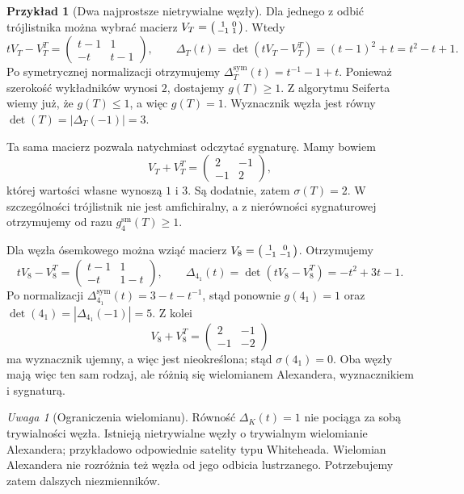 \documentclass[11pt,a4paper]{report}
\numberwithin{equation}{section}
\theoremstyle{plain}
\theoremstyle{definition}
\newtheorem{przyklad}[twierdzenie]{Przykład}
\theoremstyle{remark}
\newtheorem{uwaga}[twierdzenie]{Uwaga}
\begin{document}
\begin{przyklad}[Dwa najprostsze nietrywialne węzły]
Dla jednego z odbić trójlistnika można wybrać macierz
$V_T=\begin{psmallmatrix}1&0\\-1&1\end{psmallmatrix}$. Wtedy
\[
tV_T-V_T^T=
\begin{pmatrix}t-1&1\\-t&t-1\end{pmatrix},
\qquad
\Delta_T(t)=\det(tV_T-V_T^T)=(t-1)^2+t=t^2-t+1.
\]
Po symetrycznej normalizacji otrzymujemy
$\Delta_T^{\mathrm{sym}}(t)=t^{-1}-1+t$.
Ponieważ szerokość wykładników wynosi $2$, dostajemy
$g(T)\ge 1$. Z algorytmu Seiferta wiemy już, że $g(T)\le 1$,
a więc $g(T)=1$. Wyznacznik węzła jest równy
$\det(T)=|\Delta_T(-1)|=3$.

Ta sama macierz pozwala natychmiast odczytać sygnaturę.
Mamy bowiem
\[
V_T+V_T^T=
\begin{pmatrix}2&-1\\-1&2\end{pmatrix},
\]
której wartości własne wynoszą $1$ i $3$. Są dodatnie,
zatem $\sigma(T)=2$. W szczególności trójlistnik nie jest
amfichiralny, a z nierówności sygnaturowej otrzymujemy od razu
$g_4^{\mathrm{sm}}(T)\ge 1$.

Dla węzła ósemkowego można wziąć macierz
$V_8=\begin{psmallmatrix}1&0\\-1&-1\end{psmallmatrix}$. Otrzymujemy
\[
tV_8-V_8^T=
\begin{pmatrix}t-1&1\\-t&1-t\end{pmatrix},
\qquad
\Delta_{4_1}(t)=\det(tV_8-V_8^T)=-t^2+3t-1.
\]
Po normalizacji
$\Delta_{4_1}^{\mathrm{sym}}(t)=3-t-t^{-1}$,
stąd ponownie $g(4_1)=1$ oraz
$\det(4_1)=|\Delta_{4_1}(-1)|=5$.
Z kolei
\[
V_8+V_8^T=
\begin{pmatrix}2&-1\\-1&-2\end{pmatrix}
\]
ma wyznacznik ujemny, a więc jest nieokreślona; stąd
$\sigma(4_1)=0$. Oba węzły mają więc ten sam rodzaj,
ale różnią się wielomianem Alexandera, wyznacznikiem i sygnaturą.
\end{przyklad}

\begin{uwaga}[Ograniczenia wielomianu]
Równość $\Delta_K(t)=1$ nie pociąga za sobą trywialności węzła.
Istnieją nietrywialne węzły o trywialnym wielomianie Alexandera;
przykładowo odpowiednie satelity typu Whiteheada. Wielomian
Alexandera nie rozróżnia też węzła od jego odbicia lustrzanego.
Potrzebujemy zatem dalszych niezmienników.
\end{uwaga}
\end{document}
